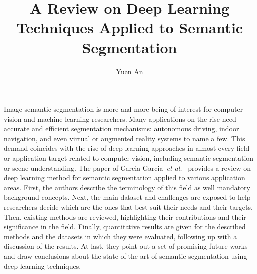 \documentclass[10pt,twocolumn,letterpaper]{article}
\begin{document}
	\title{A Review on Deep Learning Techniques Applied to Semantic Segmentation}	
	\author{Yuan An}
	\maketitle
	Image semantic segmentation is more and more being of interest for computer vision and machine learning researchers. Many applications on the rise need accurate and efficient segmentation mechanisms: autonomous driving, indoor navigation, and even virtual or augmented reality systems to name a few. This demand coincides with the rise of deep learning approaches in almost every field or application target related to computer vision, including semantic segmentation or scene understanding. The paper of Garcia-Garcia~\emph{et al.}~\cite{citedarticle} provides a review on deep learning method for semantic segmentation applied to various application areas. First, the authors describe the terminology of this field as well mandatory background concepts. Next, the main dataset and challenges are exposed to help researchers decide which are the ones that best suit their needs and their targets. Then, existing methods are reviewed, highlighting their contributions and their significance in the field. Finally, quantitative results are given for the described methods and the datasets in which they were evaluated, following up with a discussion of the results. At last, they point out a set of promising future works and draw conclusions about the state of the art of semantic segmentation using deep learning techniques.
\end{document}
